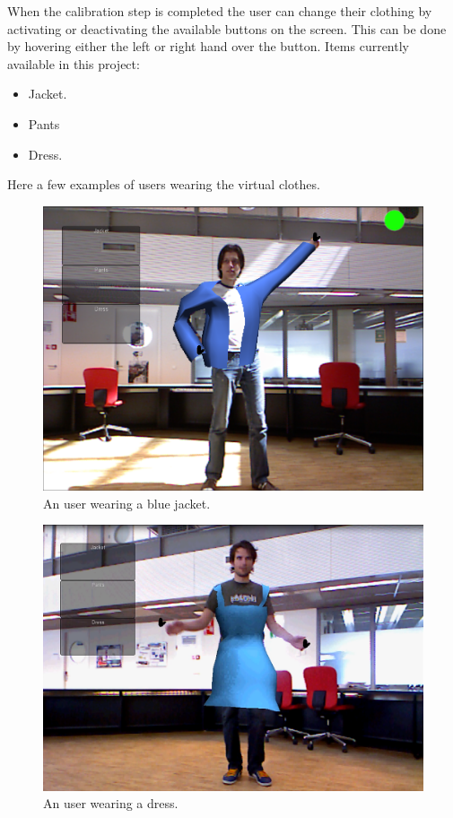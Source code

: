\documentclass[a4paper]{article}
\begin{document}
When the calibration step is completed the user can change their clothing by activating or deactivating the available buttons on the screen. This can be done by hovering either the left or right hand over the button.
Items currently available in this project:
\begin{itemize}
\item Jacket.
\item Pants 
\item Dress.
\end{itemize}
Here a few examples of users wearing the virtual clothes.
\begin{figure}[h!]
\centering
\includegraphics[scale=0.4]{GUI_jacket_morris.png} 
\caption{An user wearing a blue jacket.}
\label{fig:jacket_morris}
\end{figure}

\begin{figure}[h!]
\centering
\includegraphics[scale=0.4]{dress_fedde.png} 
\caption{An user wearing a dress.}
\label{fig:dress_fedde}
\end{figure}
\end{document}
